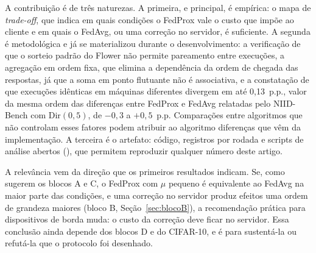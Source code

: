 A contribuição é de três naturezas. A primeira, e principal, é empírica: o mapa de \textit{trade-off}, que indica em quais condições o FedProx vale o custo que impõe ao cliente e em quais o FedAvg, ou uma correção no servidor, é suficiente. A segunda é metodológica e já se materializou durante o desenvolvimento: a verificação de que o sorteio padrão do Flower não permite pareamento entre execuções, a agregação em ordem fixa, que elimina a dependência da ordem de chegada das respostas, já que a soma em ponto flutuante não é associativa, e a constatação de que execuções idênticas em máquinas diferentes divergem em até 0,13~p.p., valor da mesma ordem das diferenças entre FedProx e FedAvg relatadas pelo NIID-Bench com $\mathrm{Dir}(0{,}5)$, de $-0{,}3$ a $+0{,}5$~p.p. Comparações entre algoritmos que não controlam esses fatores podem atribuir ao algoritmo diferenças que vêm da implementação. A terceira é o artefato: código, registros por rodada e scripts de análise abertos (\linkProjeto), que permitem reproduzir qualquer número deste artigo.

A relevância vem da direção que os primeiros resultados indicam. Se, como sugerem os blocos A e C, o FedProx com $\mu$ pequeno é equivalente ao FedAvg na maior parte das condições, e uma correção no servidor produz efeitos uma ordem de grandeza maiores (bloco B, Seção~\ref{sec:blocoB}), a recomendação prática para dispositivos de borda muda: o custo da correção deve ficar no servidor. Essa conclusão ainda depende dos blocos D e do CIFAR-10, e é para sustentá-la ou refutá-la que o protocolo foi desenhado.
